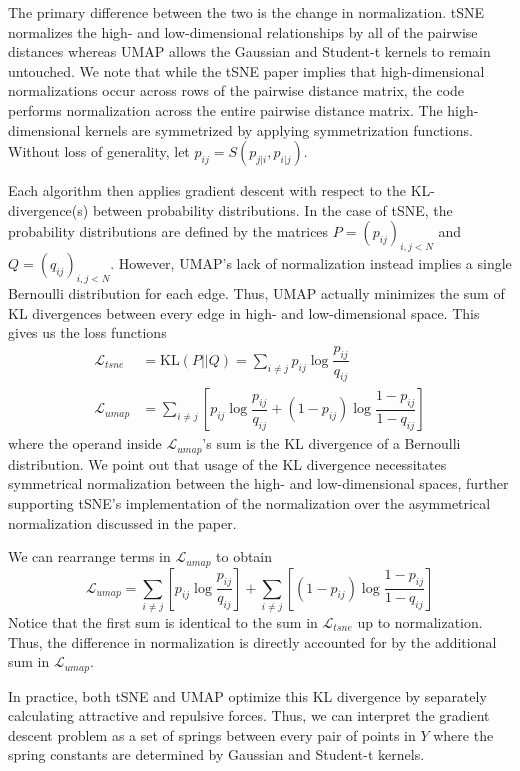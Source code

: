 \documentclass{article}
\theoremstyle{definition}
\begin{document}
\begin{multicols}{2}
The primary difference between the two is the change in normalization. tSNE normalizes the high- and low-dimensional relationships by all of the pairwise
distances whereas UMAP allows the Gaussian and Student-t kernels to remain untouched. We note that while the tSNE paper implies that high-dimensional
normalizations occur across rows of the pairwise distance matrix, the code performs normalization across the entire pairwise distance matrix. The high-dimensional kernels are symmetrized by applying
symmetrization functions. Without loss of generality, let $p_{ij} = S(p_{j|i}, p_{i|j})$.

Each algorithm then applies gradient descent with respect to the KL-divergence(s) between probability distributions. In the case of tSNE, the probability
distributions are defined by the matrices $P = \left( p_{ij} \right)_{i, j < N}$ and $Q = \left( q_{ij}
\right)_{i, j < N}$. However, UMAP's lack of normalization instead implies a single Bernoulli distribution for each edge. Thus, UMAP actually minimizes the sum of
KL divergences between every edge in high- and low-dimensional space. This gives us the loss functions
\begin{align}
    \mathcal{L}_{tsne} &= \text{KL} (P || Q) = \sum_{i \neq j} p_{ij} \log \dfrac{p_{ij}}{q_{ij}} \\
    \mathcal{L}_{umap} &= \sum_{i \neq j} \left[ p_{ij} \log \dfrac{p_{ij}}{q_{ij}} + (1 - p_{ij}) \log \dfrac{1 - p_{ij}}{1 - q_{ij}} \right]
\end{align}
where the operand inside $\mathcal{L}_{umap}$'s sum is the KL divergence of a Bernoulli distribution. We point out that usage of the KL divergence necessitates
symmetrical normalization between the high- and low-dimensional spaces, further supporting tSNE's implementation of the normalization over the asymmetrical
normalization discussed in the paper.

We can rearrange terms in $\mathcal{L}_{umap}$ to obtain
\[ \mathcal{L}_{umap} = \sum_{i \neq j} \left[ p_{ij} \log \dfrac{p_{ij}}{q_{ij}} \right] + \sum_{i \neq j} \left[ (1 - p_{ij}) \log \dfrac{1 - p_{ij}}{1 - q_{ij}} \right] \]
Notice that the first sum is identical to the sum in $\mathcal{L}_{tsne}$ up to normalization. Thus, the difference in normalization is directly accounted for
by the additional sum in $\mathcal{L}_{umap}$.

In practice, both tSNE and UMAP optimize this KL divergence by separately calculating attractive and repulsive forces. Thus, we can interpret the gradient
descent problem as a set of springs between every pair of points in $Y$ where the spring constants are determined by Gaussian and Student-t kernels.


\end{multicols}
\end{document}
